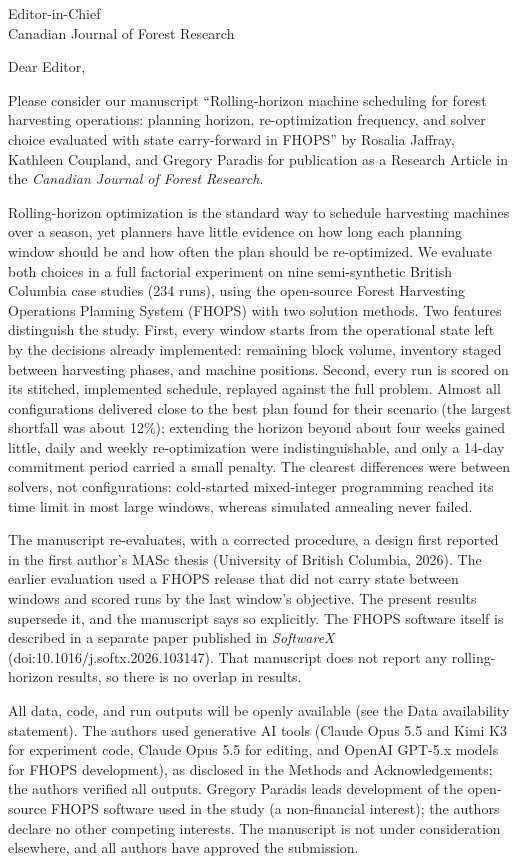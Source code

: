 \documentclass[11pt,letterpaper]{letter}
\begin{document}
\begin{letter}{Editor-in-Chief\\Canadian Journal of Forest Research}
\opening{Dear Editor,}

Please consider our manuscript ``Rolling-horizon machine scheduling for forest harvesting
operations: planning horizon, re-optimization frequency, and solver choice evaluated with state
carry-forward in FHOPS'' by Rosalia Jaffray, Kathleen Coupland, and Gregory Paradis for
publication as a Research Article in the \emph{Canadian Journal of Forest Research}.

Rolling-horizon optimization is the standard way to schedule harvesting machines over a season,
yet planners have little evidence on how long each planning window should be and how often the
plan should be re-optimized. We evaluate both choices in a full factorial experiment on nine
semi-synthetic British Columbia case studies (234 runs), using the open-source Forest Harvesting
Operations Planning System (FHOPS) with two solution methods. Two features distinguish the study.
First, every window starts from the operational state left by the decisions already implemented:
remaining block volume, inventory staged between harvesting phases, and machine positions.
Second, every run is scored on its stitched, implemented schedule, replayed against the full
problem. Almost all configurations delivered close to the best plan found for their scenario (the
largest shortfall was about 12\%); extending the horizon beyond about four weeks gained little, daily and weekly
re-optimization were indistinguishable, and only a 14-day commitment period carried a small
penalty. The clearest differences were between solvers, not configurations: cold-started
mixed-integer programming reached its time limit in most large windows, whereas simulated
annealing never failed.

The manuscript re-evaluates, with a corrected procedure, a design first reported in the first
author's MASc thesis (University of British Columbia, 2026). The earlier evaluation used a FHOPS
release that did not carry state between windows and scored runs by the last window's
objective. The present results supersede it, and the manuscript says so explicitly. The FHOPS
software itself is described in a separate paper published in \emph{SoftwareX}
(doi:10.1016/j.softx.2026.103147). That
manuscript does not report any rolling-horizon results, so there is no overlap in results.

All data, code, and run outputs will be openly available (see the Data availability statement).
The authors used generative AI tools (Claude Opus 5.5 and Kimi K3 for experiment code, Claude
Opus 5.5 for editing, and OpenAI GPT-5.x models for FHOPS development), as disclosed in the
Methods and Acknowledgements; the authors verified all outputs. Gregory Paradis leads development of the
open-source FHOPS software used in the study (a non-financial interest); the authors declare no
other competing interests. The manuscript
is not under consideration elsewhere, and all authors have approved the submission.


\end{letter}
\end{document}
